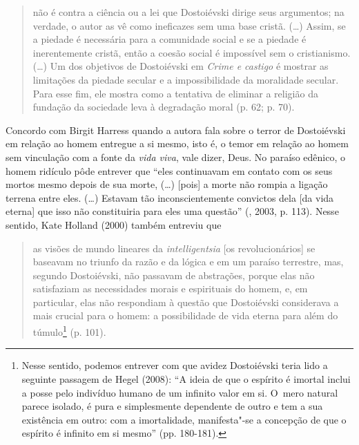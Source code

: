\begin{quote}
não é contra a ciência ou a lei que Dostoiévski dirige seus argumentos;
na verdade, o autor as vê como ineficazes sem uma base cristã. (\ldots)
Assim, se a piedade é necessária para a comunidade social e se a piedade
é inerentemente cristã, então a coesão social é impossível sem o
cristianismo. (\ldots) Um dos objetivos de Dostoiévski em \emph{Crime e
castigo} é mostrar as limitações da piedade secular e a impossibilidade
da moralidade secular. Para esse fim, ele mostra como a tentativa de
eliminar a religião da fundação da sociedade leva à degradação moral (p.
62; p. 70).
\end{quote}

Concordo com Birgit Harress quando a autora fala sobre o terror de
Dostoiévski em relação ao homem entregue a si mesmo, isto é, o temor em
relação ao homem sem vinculação com a fonte da \emph{vida viva}, vale
dizer, Deus. No paraíso edênico, o homem ridículo pôde entrever que
``eles continuavam em contato com os seus mortos mesmo depois de sua
morte, (\ldots) {[}pois{]} a morte não rompia a ligação terrena entre eles.
(\ldots) Estavam tão inconscientemente convictos dela {[}da vida eterna{]}
que isso não constituiria para eles uma questão'' (, 2003, p.
113). Nesse sentido, Kate Holland (2000) também entreviu que

\begin{quote}
as visões de mundo lineares da \emph{intelligentsia} {[}os
revolucionários{]} se baseavam no triunfo da razão e da lógica e em um
paraíso terrestre, mas, segundo Dostoiévski, não passavam de abstrações,
porque elas não satisfaziam as necessidades morais e espirituais do
homem, e, em particular, elas não respondiam à questão que Dostoiévski
considerava a mais crucial para o homem: a possibilidade de vida eterna
para além do túmulo\footnote{Nesse sentido, podemos entrever com que
  avidez Dostoiévski teria lido a seguinte passagem de Hegel (2008): ``A
  ideia de que o espírito é imortal inclui a posse pelo indivíduo humano
  de um infinito valor em si. O~mero natural parece isolado, é pura e
  simplesmente dependente de outro e tem a sua existência em outro: com
  a imortalidade, manifesta"-se a concepção de que o espírito é infinito
  em si mesmo'' (pp. 180-181).} (p. 101).
\end{quote}

